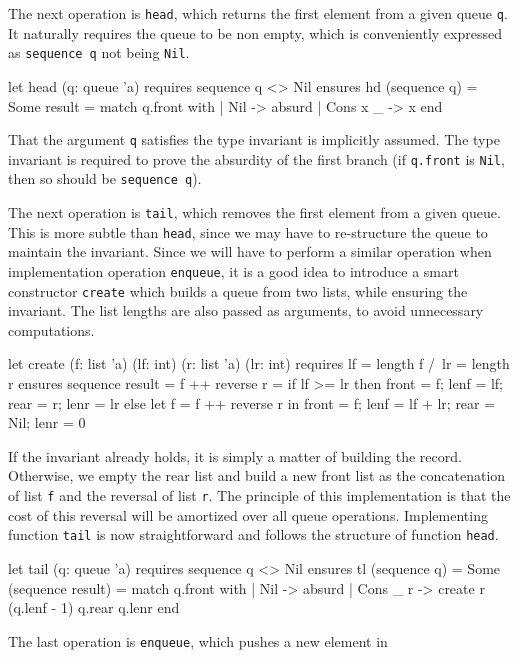 The next operation is \texttt{head}, which returns the first element from
a given queue \texttt{q}. It naturally requires the queue to be non
empty, which is conveniently expressed as \texttt{sequence q} not
being \texttt{Nil}.
\begin{whycode}
  let head (q: queue 'a)
    requires { sequence q <> Nil }
    ensures { hd (sequence q) = Some result }
  = match q.front with
      | Nil      -> absurd
      | Cons x _ -> x
    end
\end{whycode}
That the argument \texttt{q} satisfies the type invariant is
implicitly assumed. The type invariant is
required to prove the absurdity of the first branch (if
\texttt{q.front} is \texttt{Nil}, then so should be \texttt{sequence q}).

The next operation is \texttt{tail}, which removes the first element
from a given queue. This is more subtle than \texttt{head}, since we
may have to re-structure the queue to maintain the invariant.
Since we will have to perform a similar operation when implementation
operation \texttt{enqueue}, it is a good idea to introduce a smart
constructor \texttt{create} which builds a queue from two lists, while
ensuring the invariant. The list lengths are also passed as arguments,
to avoid unnecessary computations.
\begin{whycode}
  let create (f: list 'a) (lf: int) (r: list 'a) (lr: int)
    requires { lf = length f /\ lr = length r }
    ensures  { sequence result = f ++ reverse r }
  = if lf >= lr then
      { front = f; lenf = lf; rear = r; lenr = lr }
    else
      let f = f ++ reverse r in
      { front = f; lenf = lf + lr; rear = Nil; lenr = 0 }
\end{whycode}
If the invariant already holds, it is simply a matter of building the
record. Otherwise, we empty the rear list and build a new front list
as the concatenation of list \texttt{f} and the reversal of list \texttt{r}.
The principle of this implementation is that the cost of this reversal
will be amortized over all queue operations. Implementing function
\texttt{tail} is now straightforward and follows the structure of
function \texttt{head}.
\begin{whycode}
  let tail (q: queue 'a)
    requires { sequence q <> Nil }
    ensures  { tl (sequence q) = Some (sequence result) }
  = match q.front with
      | Nil      -> absurd
      | Cons _ r -> create r (q.lenf - 1) q.rear q.lenr
    end
\end{whycode}
The last operation is \texttt{enqueue}, which pushes a new element in
